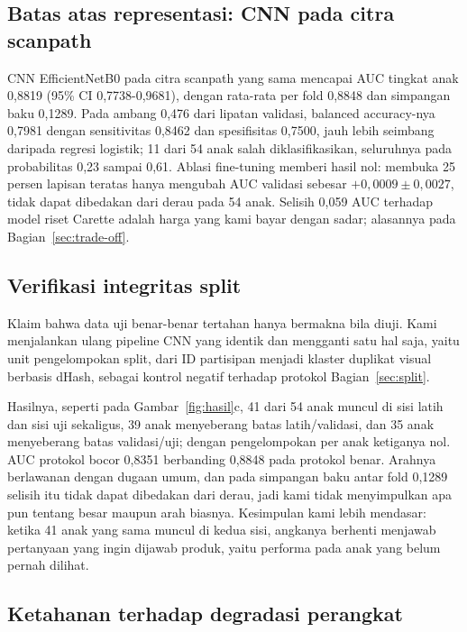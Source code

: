 \documentclass{article}
\begin{document}
\subsection{Batas atas representasi: CNN pada citra scanpath}

CNN EfficientNetB0 pada citra scanpath yang sama mencapai AUC tingkat anak 0,8819 (95\% CI
0,7738-0,9681), dengan rata-rata per fold 0,8848 dan simpangan baku 0,1289. Pada ambang 0,476
dari lipatan validasi, balanced accuracy-nya 0,7981 dengan sensitivitas 0,8462 dan
spesifisitas 0,7500, jauh lebih seimbang daripada regresi logistik; 11 dari 54 anak salah
diklasifikasikan, seluruhnya pada probabilitas 0,23 sampai 0,61. Ablasi fine-tuning memberi
hasil nol: membuka 25 persen lapisan teratas hanya mengubah AUC validasi sebesar
$+0,0009 \pm 0,0027$, tidak dapat dibedakan dari derau pada 54 anak. Selisih 0,059 AUC
terhadap model riset Carette adalah harga yang kami bayar dengan sadar; alasannya pada
Bagian~\ref{sec:trade-off}.

\subsection{Verifikasi integritas split}
\label{sec:kebocoran}

Klaim bahwa data uji benar-benar tertahan hanya bermakna bila diuji. Kami menjalankan ulang
pipeline CNN yang identik dan mengganti satu hal saja, yaitu unit pengelompokan split, dari
ID partisipan menjadi klaster duplikat visual berbasis dHash, sebagai kontrol
negatif terhadap protokol Bagian~\ref{sec:split}.

Hasilnya, seperti pada Gambar~\ref{fig:hasil}c, 41 dari 54 anak muncul di sisi latih dan
sisi uji sekaligus, 39 anak menyeberang batas latih/validasi, dan 35 anak menyeberang batas
validasi/uji; dengan pengelompokan per anak ketiganya nol. AUC protokol bocor 0,8351
berbanding 0,8848 pada protokol benar. Arahnya berlawanan dengan dugaan umum, dan pada
simpangan baku antar fold 0,1289 selisih itu tidak dapat dibedakan dari derau, jadi kami
tidak menyimpulkan apa pun tentang besar maupun arah biasnya. Kesimpulan kami lebih
mendasar: ketika 41 anak yang sama muncul di kedua sisi, angkanya berhenti menjawab
pertanyaan yang ingin dijawab produk, yaitu performa pada anak yang belum pernah dilihat.

\subsection{Ketahanan terhadap degradasi perangkat}
\end{document}
